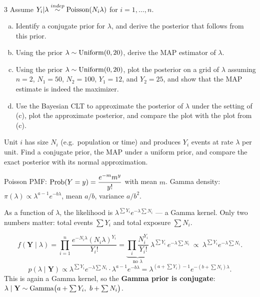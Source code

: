 \documentclass[11pt]{article}
\begin{document}

\begin{problem}{3}
Assume $Y_i|\lambda\overset{indep}{\sim}\mathrm{Poisson}(N_i\lambda)$ for $i=1,\dots,n$.
\begin{enumerate}[(a)]
\item Identify a conjugate prior for $\lambda$, and derive the posterior that follows from this prior.
\item Using the prior $\lambda\sim\mathrm{Uniform}(0,20)$, derive the MAP estimator of $\lambda$.
\item Using the prior $\lambda\sim\mathrm{Uniform}(0,20)$, plot the posterior on a grid of $\lambda$ assuming $n=2$, $N_1=50$, $N_2=100$, $Y_1=12$, and $Y_2=25$, and show that the MAP estimate is indeed the maximizer.
\item Use the Bayesian CLT to approximate the posterior of $\lambda$ under the setting of (c), plot the approximate posterior, and compare the plot with the plot from (c).
\end{enumerate}
\end{problem}

\begin{restate}
Unit $i$ has size $N_i$ (e.g.\ population or time) and produces $Y_i$ events at rate $\lambda$ per unit. Find a conjugate prior, the MAP under a uniform prior, and compare the exact posterior with its normal approximation.
\end{restate}

\begin{recall}
Poisson PMF: $\mathrm{Prob}(Y=y)=\dfrac{e^{-m}m^y}{y!}$ with mean $m$. Gamma density: $\pi(\lambda)\propto\lambda^{a-1}e^{-b\lambda}$, mean $a/b$, variance $a/b^2$.
\end{recall}

\begin{keyidea}
As a function of $\lambda$, the likelihood is $\lambda^{\sum Y_i}e^{-\lambda\sum N_i}$ --- a Gamma kernel. Only two numbers matter: total events $\sum Y_i$ and total exposure $\sum N_i$.
\end{keyidea}

\solution
{}
\[
f(\mathbf Y\mid\lambda)=\prod_{i=1}^n\frac{e^{-N_i\lambda}(N_i\lambda)^{Y_i}}{Y_i!}
=\underbrace{\prod_i\frac{N_i^{Y_i}}{Y_i!}}_{\text{no }\lambda}\ \lambda^{\sum Y_i}\,e^{-\lambda\sum N_i}
\ \propto\ \lambda^{\sum Y_i}e^{-\lambda\sum N_i}.
\]
\[
p(\lambda\mid\mathbf Y)\propto\lambda^{\sum Y_i}e^{-\lambda\sum N_i}\cdot\lambda^{a-1}e^{-b\lambda}
=\lambda^{(a+\sum Y_i)-1}e^{-(b+\sum N_i)\lambda}.
\]
This is again a Gamma kernel, so the \textbf{Gamma prior is conjugate}:
$\lambda\mid\mathbf Y\sim\mathrm{Gamma}\big(a+\sum Y_i,\ b+\sum N_i\big)$.
\end{document}
